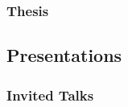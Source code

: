 \message{ !name(shin-abet.tex)}\documentclass[letterpaper, 11pt]{article}
\begin{document}
\subsubsection*{Thesis}
\renewcommand*{\labelenumi}{[T\theenumi]}

\subsection*{Presentations}
\subsubsection*{Invited Talks}
\renewcommand*{\labelenumi}{[I\theenumi]}
\end{document}
